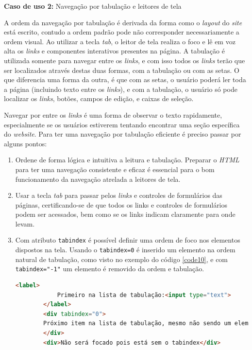{{\vspace{1.5cm}
{\centerline{\textbf{Caso de uso 2:}  Navegação por tabulação e leitores de tela}}

A ordem da navegação por tabulação é derivada da forma como o \textit{layout} do \textit{site} está escrito, contudo a ordem padrão pode não corresponder necessariamente a ordem visual. Ao utilizar a tecla \textit{tab}, o leitor de tela realiza o foco e lê em voz alta os \textit{links} e componentes interativos presentes na página.  A tabulação é utilizada somente para navegar entre os \textit{links}, e com isso todos os \textit{links} terão que ser localizados através destas duas formas, com a tabulação ou com as setas. O que diferencia uma forma da outra, é que com as setas, o usuário poderá ler toda a página (incluindo texto entre os \textit{links}), e com a tabulação, o usuário só pode localizar os \textit{links}, botões, campos de edição, e caixas de seleção.

Navegar por entre os \textit{links} é uma forma de observar o texto rapidamente, especialmente se os usuários estiverem tentando encontrar uma seção específica do \textit{website}. Para ter uma navegação por tabulação eficiente é preciso passar por alguns pontos: 

\begin{enumerate}
    \item Ordene de forma lógica e intuitiva a leitura e tabulação. Preparar o \textit{HTML} \cite{HTML} para ter uma navegação consistente e eficaz é essencial para o bom funcionamento da navegação atrelada a leitores de tela. 
    \item Usar a tecla \textit{tab} para passar pelos \textit{links} e controles de formulários
    das páginas, certificando-se de que todos os links e controles de formulários podem ser acessados, bem como se os links indicam claramente para onde levam. 
    
    \item Com atributo \lstinline{tabindex} é possível definir uma ordem de foco nos elementos dispostos na tela. Usando o \lstinline{tabindex=0} é inserido um elemento na ordem natural de tabulação, como visto no exemplo do código \ref{code10}, e com \lstinline{tabindex="-1"} um elemento é removido da ordem e tabulação.
    {\begin{lstlisting}[language=html,caption={Uso do atributo \textit{tabindex} para adicionar um elemento a ordem de foco}, label=code10]
        <label>
            Primeiro na lista de tabulação:<input type="text">
        </label>
        <div tabindex="0">
        Próximo item na lista de tabulação, mesmo não sendo um elemento que receberia o foco natural
        </div>
        <div>Não será focado pois está sem o tabindex</div>
    \end{lstlisting}}
    

\end{enumerate}}}
